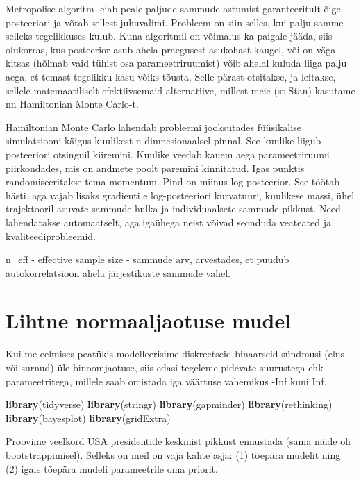 \documentclass[]{book}
\newenvironment{Shaded}{\begin{snugshade}}{\end{snugshade}}
\newcommand{\KeywordTok}[1]{\textcolor[rgb]{0.13,0.29,0.53}{\textbf{#1}}}
\newcommand{\NormalTok}[1]{#1}
\begin{document}
Metropolise algoritm leiab peale paljude sammude astumist garanteeritult
õige posteeriori ja võtab sellest juhuvalimi. Probleem on siin selles,
kui palju samme selleks tegelikkuses kulub. Kuna algoritmil on võimalus
ka paigale jääda, siis olukorras, kus posteerior asub ahela praegusest
asukohast kaugel, või on väga kitsas (hõlmab vaid tühist osa
parameetriruumist) võib ahelal kuluda liiga palju aega, et temast
tegelikku kasu võiks tõusta. Selle pärast otsitakse, ja leitakse,
sellele matemaatiliselt efektiivsemaid alternatiive, millest meie (st
Stan) kasutame nn Hamiltonian Monte Carlo-t.

Hamiltonian Monte Carlo lahendab probleemi jooksutades füüsikalise
simulatsiooni käigus kuulikest n-dimnesionaalsel pinnal. See kuulike
liigub posteeriori otsinguil kiiremini. Kuulike veedab kauem aega
parameetriruumi piirkondades, mis on andmete poolt paremini kinnitatud.
Igas punktis randomiseeritakse tema momentum. Pind on miinus log
posteerior. See töötab hästi, aga vajab lisaks gradienti e
log-posteeriori kurvatuuri, kuulikese massi, ühel trajektooril asuvate
sammude hulka ja individuaalsete sammude pikkust. Need lahendatakse
automaatselt, aga igaühega neist võivad seonduda veateated ja
kvaliteediprobleemid.

n\_eff - effective sample size - sammude arv, arvestades, et puudub
autokorrelatsioon ahela järjestikuste sammude vahel.

\chapter{Lihtne normaaljaotuse mudel}\label{lihtne-normaaljaotuse-mudel}

Kui me eelmises peatükis modelleerisime diskreetseid binaarseid sündmusi
(elus või surnud) üle binoomjaotuse, siis edasi tegeleme pidevate
suurustega ehk parameetritega, millele saab omistada iga väärtuse
vahemikus -Inf kuni Inf.

\begin{Shaded}
\begin{Highlighting}[]
\KeywordTok{library}\NormalTok{(tidyverse)}
\KeywordTok{library}\NormalTok{(stringr)}
\KeywordTok{library}\NormalTok{(gapminder)}
\KeywordTok{library}\NormalTok{(rethinking)}
\KeywordTok{library}\NormalTok{(bayesplot)}
\KeywordTok{library}\NormalTok{(gridExtra)}
\end{Highlighting}
\end{Shaded}

Proovime veelkord USA presidentide keskmist pikkust ennustada (sama
näide oli bootstrappimisel). Selleks on meil on vaja kahte asja: (1)
tõepära mudelit ning (2) igale tõepära mudeli parameetrile oma priorit.
\end{document}
